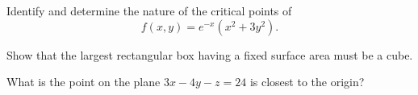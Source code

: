 \documentclass[11pt,letterpaper,boxed]{hmcpset}
\newcommand{\pn}[1]{\left( #1 \right)}
\begin{document}
\begin{problem}[Colley 4.2 \#12]
Identify and determine the nature of the critical points of
\[
	f(x,y) = e^{-x}\pn{x^2+3y^2}.
\]
\end{problem}

\begin{solution}
\vfill
\end{solution}
\newpage

\begin{problem}[Colley 4.2 \#28]
Show that the largest rectangular box having a fixed surface area must be a cube.
\end{problem}

\begin{solution}
\vfill
\end{solution}
\newpage

\begin{problem}[Colley 4.2 \#29]
What is the point on the plane $3x-4y-z=24$ is closest to the origin?
\end{problem}

\begin{solution}
\vfill
\end{solution}
\newpage
\end{document}
